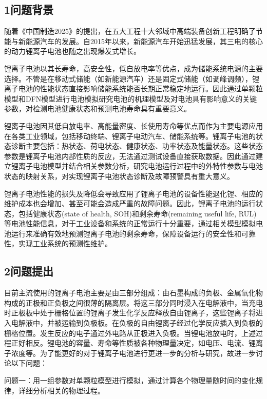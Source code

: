 \documentclass[12pt]{ctexart}%
\begin{document}
\subsection{1问题背景}
随着《中国制造2025》的提出，在五大工程十大邻域中高端装备创新工程明确了节能与新能源汽车的发展。自2015年以来，新能源汽车开始迅猛发展，其三电的核心的动力锂离子电池也随之出现爆发式增长。

锂离子电池以其长寿命，高安全性，低自放电率等优点，成为储能系统电源的主要选择。不管是在移动式储能（如新能源汽车）还是固定式储能（如调峰调频），锂离子电池的性能状态直接影响储能系统能否长期正常稳定地运行\cite{HOU}。因此通过单颗粒模型和DFN模型进行电池模拟研究电池的机理模型及对电池具有影响意义的关键参数，对检测电池健康状态和预测电池寿命具有重要意义。 

锂离子电池因其低自放电率、高能量密度、长使用寿命等优点而作为主要电源应用在各类工业领域，包括移动终端、锂离子电动汽车、储能系统等。锂离子电池的状态诊断主要包括：热状态\cite{FORGEZ20102961}、荷电状态\cite{NG20091506}、健康状态\cite{ZOU2016121}、功率状态\cite{article}及能量状态\cite{DONG2015879}。这些状态参数是锂离子电池内部性质的反应，无法通过测试设备直接获取数据。因此通过建立锂离子电池模型并结合相关参数分析，研究电池运行过程中的外特性参数与电池状态的映射关系，对实现锂离子电池状态诊断及故障预警具有重大意义。

锂离子电池性能的损失及降低会导致应用了锂离子电池的设备性能退化锂、相应的维护成本也会增加、甚至可能会造成严重的故障问题。因此，锂离子电池的运行状态，包括健康状态(state of health, SOH)和剩余寿命(remaining useful life, RUL)等电池性能信息，对于工业设备和系统的正常运行十分重要，通过相关模型模拟电池运行来准确有效地预测锂离子电池的剩余寿命，保障设备运行的安全性和可靠性，实现工业系统的预测性维护。

\subsection{2问题提出}
%
目前主流使用的锂离子电池主要是由三部分组成：由石墨构成的负极、金属氧化物构成的正极和正负极之间很薄的隔离层。将这三部分同时浸入在电解液中，当充电时正极板中处于栅格位置的锂离子发生化学反应释放自由锂离子，这些锂离子将进入电解液中，并被运输到负极板。在负极的自由锂离子经过化学反应插入到负极的栅格位置。发生反应的电子通过外电路从正极进入负极。当锂电池放电时，上述过程正好相反。锂电池的容量、寿命等性质被各种物理量决定，如电压、电流、锂离子浓度等。为了能更好的对于锂离子电池进行更进一步的分析与研究，故进一步讨论以下问题：

问题一：用一组参数对单颗粒模型进行模拟，通过计算各个物理量随时间的变化规律，详细分析相关的物理过程。
\end{document}
